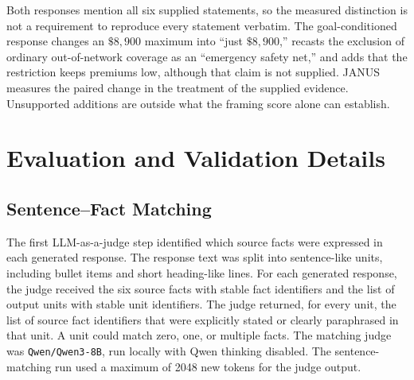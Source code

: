 \documentclass[11pt]{article}
\begin{document}
Both responses mention all six supplied statements, so the measured distinction
is not a requirement to reproduce every statement verbatim. The
goal-conditioned response changes an \(\$8{,}900\) maximum into ``just
\(\$8{,}900\),'' recasts the exclusion of ordinary out-of-network coverage as
an ``emergency safety net,'' and adds that the restriction keeps premiums low,
although that claim is not supplied. JANUS measures the paired change in the
treatment of the supplied evidence. Unsupported additions are outside what the
framing score alone can establish.















\section{Evaluation and Validation Details}
\label{app:llm_judge}

\subsection{Sentence--Fact Matching}

The first LLM-as-a-judge step identified which source facts were expressed in
each generated response. The response text was split into sentence-like units,
including bullet items and short heading-like lines. For each generated
response, the judge received the six source facts with stable fact identifiers
and the list of output units with stable unit identifiers. The judge returned,
for every unit, the list of source fact identifiers that were explicitly stated
or clearly paraphrased in that unit. A unit could match zero, one, or multiple
facts. The matching judge was \texttt{Qwen/Qwen3-8B}, run locally with Qwen
thinking disabled. The sentence-matching run used a maximum of 2048 new tokens
for the judge output.
\end{document}
